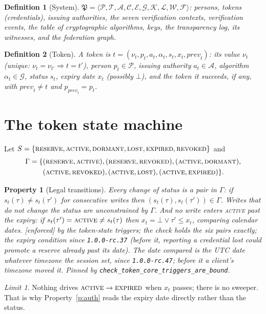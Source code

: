 \documentclass[11pt]{article}
\newtheorem{property}{Property}
\newtheorem{definition}{Definition}
\theoremstyle{remark}
\newtheorem*{limit}{Limit}
\newcommand{\PP}{\mathfrak P}
\newcommand{\Tok}{\mathcal T}
\newcommand{\Per}{\mathcal P}
\newcommand{\Ag}{\mathcal A}
\newcommand{\Alg}{\mathcal G}
\newcommand{\Ev}{\mathcal E}
\newcommand{\Ctx}{\mathcal C}
\newcommand{\code}[1]{\texttt{#1}}
\newcommand{\emark}[1]{\textup{\textsf{[#1]}}}
\newcommand{\st}[1]{\textup{\textsc{#1}}}
\begin{document}
\begin{definition}[System]
$\PP = \langle \Per, \Tok, \Ag, \Ctx, \Ev, \Alg, \mathcal K, \mathcal L, \mathcal W, \mathcal F\rangle$:
persons, tokens (credentials), issuing authorities, the seven verification contexts, verification
events, the table of cryptographic algorithms, keys, the transparency log, its witnesses, and the
federation graph.
\end{definition}

\begin{definition}[Token]
A token is $t=(\nu_t,p_t,a_t,\alpha_t,s_t,x_t,\mathit{prev}_t)$: its value $\nu_t$ (unique:
$\nu_t=\nu_{t'}\Rightarrow t=t'$), person $p_t\in\Per$, issuing authority $a_t\in\Ag$,
algorithm $\alpha_t\in\Alg$, status $s_t$, expiry date $x_t$ (possibly $\bot$), and the token it
succeeds, if any, with $\mathit{prev}_t\neq t$ and $p_{\mathit{prev}_t}=p_t$.
\end{definition}

\section{The token state machine}

Let $S=\{\st{reserve},\st{active},\st{dormant},\st{lost},\st{expired},\st{revoked}\}$
and
\begin{align*}
\Gamma=\{&(\st{reserve},\st{active}),(\st{reserve},\st{revoked}),(\st{active},\st{dormant}),\\
&(\st{active},\st{revoked}),(\st{active},\st{lost}),(\st{active},\st{expired})\}.
\end{align*}
\begin{property}[Legal transitions]\label{p:sm}
Every change of status is a pair in $\Gamma$: if $s_t(\tau)\neq s_t(\tau')$ for consecutive writes
then $(s_t(\tau),s_t(\tau'))\in\Gamma$. Writes that do not change the status are unconstrained by
$\Gamma$. And no write enters \st{active} past the expiry: if $s_t(\tau')=\st{active}\neq s_t(\tau)$
then $x_t=\bot\vee\tau'\le x_t$, comparing calendar dates. \emark{enforced} by the token-state
triggers; the check holds the six pairs exactly; the expiry condition since \code{1.0.0-rc.37}
(before it, reporting a credential lost could promote a reserve already past its date). The date compared is the UTC
date whatever timezone the session set, since \code{1.0.0-rc.47}; before it a client's timezone moved it. Pinned by
\code{check\_token\_core\_triggers\_are\_bound}.
\end{property}
\begin{limit}
Nothing drives $\st{active}\to\st{expired}$ when $x_t$ passes; there is no sweeper. That is why
Property~\ref{p:auth} reads the expiry date directly rather than the status.
\end{limit}
\end{document}
